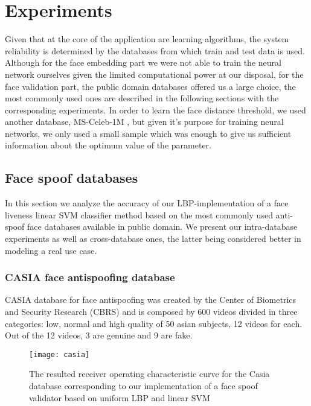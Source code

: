 \afterpage{\blankpage}
\chapter{Experiments}
Given that at the core of the application are learning algorithms, the system reliability is determined by the databases from which train and test data is used. Although for the face embedding part we were not able to train the neural network ourselves given the limited computational power at our disposal, for the face validation part, the public domain databases offered us a large choice, the most commonly used ones are described in the following sections with the corresponding experiments. In order to learn the face distance threshold, we used another database, MS-Celeb-1M \cite{guo2016msceleb}, but given it's purpose for training neural networks, we only used a small sample which was enough to give us sufficient information about the optimum value of the parameter.
\section{Face spoof databases}\label{section:face_spoof_databases}
In this section we analyze the accuracy of our LBP-implementation of a face liveness linear SVM classifier method based on the most commonly used anti-spoof face databases available in public domain. We present our intra-database experiments as well as cross-database ones, the latter being considered better in modeling a real use case.
\subsection{CASIA face antispoofing database }
CASIA database for face antispoofing was created by the Center of Biometrics and Security Research (CBRS) and is composed by 600 videos divided in three categories: low, normal and high quality of 50 asian subjects, 12 videos for each. Out of the 12 videos, 3 are genuine and 9 are fake.
\begin{figure}[H]
	\captionsetup{width=15cm,font=small}
	\begin{center}
		\texttt{[image: casia]}
	\end{center}
	\caption[CASIA database reported ROC curve]{The resulted receiver operating characteristic curve for the Casia database corresponding to our implementation of a face spoof validator based on uniform LBP and linear SVM}
	\label{fig:casia_roc}
\end{figure}

